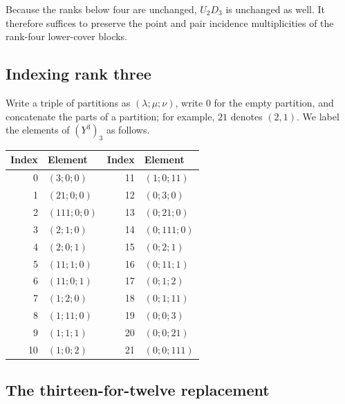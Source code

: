 \documentclass[11pt,a4paper]{amsart}
\theoremstyle{definition}
\theoremstyle{remark}
\begin{document}
Because the ranks below four are unchanged, $U_2D_3$ is unchanged as well. It therefore suffices to preserve the point and pair incidence multiplicities of the rank-four lower-cover blocks.

\subsection{Indexing rank three}

Write a triple of partitions as $(\lambda;\mu;\nu)$, write $0$ for the empty partition, and concatenate the parts of a partition; for example, $21$ denotes $(2,1)$. We label the elements of $(Y^3)_3$ as follows.

\begin{center}
\renewcommand{\arraystretch}{1.08}
\begin{tabular}{@{}r l r l@{}}
\toprule
Index & Element & Index & Element\\
\midrule
0  & $(3;0;0)$   & 11 & $(1;0;11)$\\
1  & $(21;0;0)$  & 12 & $(0;3;0)$\\
2  & $(111;0;0)$ & 13 & $(0;21;0)$\\
3  & $(2;1;0)$   & 14 & $(0;111;0)$\\
4  & $(2;0;1)$   & 15 & $(0;2;1)$\\
5  & $(11;1;0)$  & 16 & $(0;11;1)$\\
6  & $(11;0;1)$  & 17 & $(0;1;2)$\\
7  & $(1;2;0)$   & 18 & $(0;1;11)$\\
8  & $(1;11;0)$  & 19 & $(0;0;3)$\\
9  & $(1;1;1)$   & 20 & $(0;0;21)$\\
10 & $(1;0;2)$   & 21 & $(0;0;111)$\\
\bottomrule
\end{tabular}
\end{center}

\subsection{The thirteen-for-twelve replacement}\label{subsec:replacement}
\end{document}
